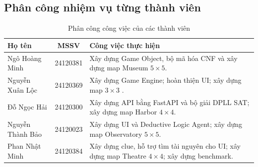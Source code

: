 \subsection{Phân công nhiệm vụ từng thành viên}
\begin{table}[h!]
    \centering
    \caption{Phân công công việc của các thành viên}
    \label{tab:task_distribution}
    \renewcommand{\arraystretch}{1.3}
    \begin{tabularx}{\textwidth}{lcX}
        \toprule
        \textbf{Họ tên} & \textbf{MSSV} & \textbf{Công việc thực hiện} \\
        \midrule
        Ngô Hoàng Minh & 24120381 & Xây dựng Game Object, bộ mã hóa CNF và xây dựng map Museum $5 \times 5$. \\
        Nguyễn Xuân Lộc & 24120369 & Xây dựng Game Engine; hoàn thiện UI; xây dựng map $3 \times 3$ . \\
        Đỗ Ngọc Hải & 24120300 & Xây dựng API bằng FastAPI và bộ giải DPLL SAT; xây dựng map Harbor $4 \times 4$. \\
        Nguyễn Thành Bảo & 24120023 & Xây dựng UI và Deductive Logic Agent; xây dựng map Observatory $5 \times 5$. \\
        Phan Nhật Minh & 24120384 & Xây dựng clue, hỗ trợ tìm tài nguyên cho UI; xây dựng map Theatre $4 \times 4$; xây dựng benchmark. \\
        \bottomrule
    \end{tabularx}
\end{table}

